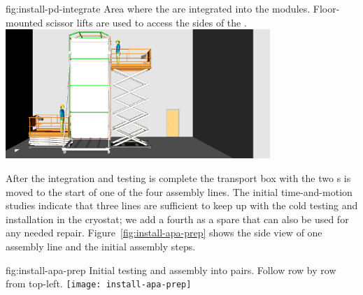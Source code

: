 \begin{dunefigure}
{fig:install-pd-integrate}
{Area where the  are integrated into the  modules. Floor-mounted scissor lifts are used to access the sides of the .}
\includegraphics[width=0.75\textwidth]{graphics/install-pd-integrate.pdf}
\end{dunefigure}

After the  integration and testing is complete the transport box with the two s is moved to the start of one of the four assembly lines. 
The initial time-and-motion studies indicate that three lines are sufficient to keep up with the cold testing and installation in the cryostat; we add a fourth %
as a spare that can also be used for any needed repair. 
Figure~\ref{fig:install-apa-prep} shows the side view of one assembly line  and the initial assembly steps. 

\begin{dunefigure}
{fig:install-apa-prep}
{Initial  testing and assembly into pairs.  Follow row by row from top-left.} %
\texttt{[image: install-apa-prep]}
\end{dunefigure}

